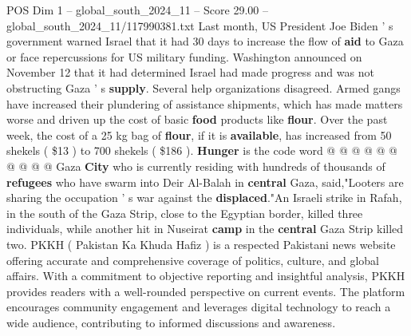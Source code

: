 \begin{textsample}{POS Dim 1 – global\_south\_2024\_11 – Score 29.00 – global\_south\_2024\_11/117990381.txt}
Last month, US President Joe Biden ' s government warned Israel that it had 30 days to increase the flow of \textbf{aid} to Gaza or face repercussions for US military funding.
Washington announced on November 12 that it had determined Israel had made progress and was not obstructing Gaza ' s \textbf{supply}.
Several help organizations disagreed.
Armed gangs have increased their plundering of assistance shipments, which has made matters worse and driven up the cost of basic \textbf{food} products like \textbf{flour}.
Over the past week, the cost of a 25 kg bag of \textbf{flour}, if it is \textbf{available}, has increased from 50 shekels ( \$13 ) to 700 shekels ( \$186 ). \textbf{Hunger} is the code word @ @ @ @ @ @ @ @ @ @ Gaza \textbf{City} who is currently residing with hundreds of thousands of \textbf{refugees} who have swarm into Deir Al-Balah in \textbf{central} Gaza, said,"Looters are sharing the occupation ' s war against the \textbf{displaced}."An Israeli strike in Rafah, in the south of the Gaza Strip, close to the Egyptian border, killed three individuals, while another hit in Nuseirat \textbf{camp} in the \textbf{central} Gaza Strip killed two.
PKKH ( Pakistan Ka Khuda Hafiz ) is a respected Pakistani news website offering accurate and comprehensive coverage of politics, culture, and global affairs.
With a commitment to objective reporting and insightful analysis, PKKH provides readers with a well-rounded perspective on current events.
The platform encourages community engagement and leverages digital technology to reach a wide audience, contributing to informed discussions and awareness.

\end{textsample}
